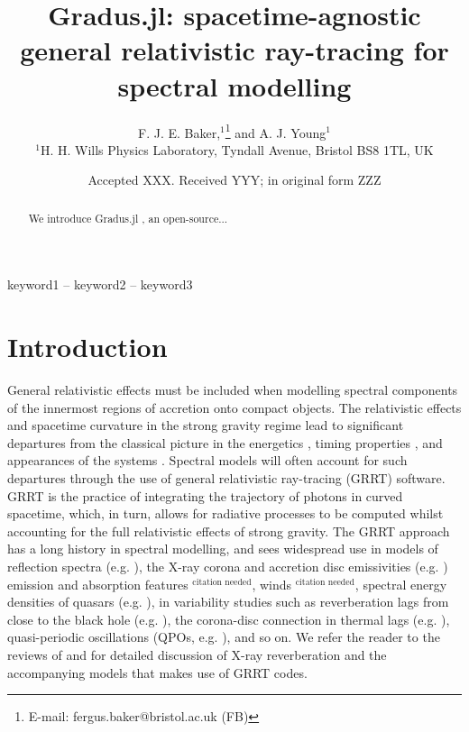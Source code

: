 \documentclass[fleqn,usenatbib]{mnras}
\title[Gradus.jl]{Gradus.jl: spacetime-agnostic general relativistic ray-tracing
for spectral modelling}
\author[F. J. E. Baker et al.]{
F. J. E. Baker,$^{1}$\thanks{E-mail: fergus.baker@bristol.ac.uk (FB)}
and A. J. Young$^{1}$
\\
$^{1}$H. H. Wills Physics Laboratory, Tyndall Avenue, Bristol BS8 1TL, UK
}
\date{Accepted XXX. Received YYY; in original form ZZZ}
\newcommand{\citneeded}{{\bf \color{red} $^{\text{citation needed}}$}}
\newcommand{\Gradus}{Gradus.jl }
\begin{document}
\label{firstpage}
\pagerange{\pageref{firstpage}--\pageref{lastpage}}
\maketitle
\begin{abstract}
	We introduce \Gradus, an open-source...
\end{abstract}

\begin{keywords}
keyword1 -- keyword2 -- keyword3
\end{keywords}



\section{Introduction}

General relativistic effects must be included when modelling spectral components
of the innermost regions of accretion onto compact objects. The relativistic
effects and spacetime curvature in the strong gravity regime lead to significant
departures from the classical picture in the energetics
\citep{cunningham_optical_1973, fabian_long_2002}, timing properties
\citep{stella_measuring_1990, reynolds_x-ray_1999}, and appearances of the
systems \citep{luminet_image_1979}. Spectral models will often account for such
departures through the use of general relativistic ray-tracing (GRRT) software.
GRRT is the practice of integrating the trajectory of photons in curved
spacetime, which, in turn, allows for radiative processes to be computed whilst
accounting for the full relativistic effects of strong gravity. The GRRT
approach has a long history in spectral modelling, and sees widespread use in
models of reflection spectra (e.g. \citealt{fabian_x-ray_1989}), the X-ray
corona and accretion disc emissivities (e.g.
\citealt{wilkins_understanding_2012, wilkins_towards_2016}) emission and
absorption features\citneeded, winds\citneeded, spectral energy densities of
quasars (e.g.  \citealt{hagen_estimating_2023}), in variability studies such as
reverberation lags from close to the black hole (e.g.
\citealt{ingram_public_2019}), the corona-disc connection in thermal lags (e.g.
\citealt{kammoun_hard_2019}), quasi-periodic oscillations (QPOs, e.g.
\citealt{tsang_iron_2013}), and so on.  We refer the reader to the reviews of
\citet{uttley_x-ray_2014} and
\citet{cackett_reverberation_2021} for detailed discussion of X-ray
reverberation and the accompanying models that makes use of GRRT codes.
\end{document}
